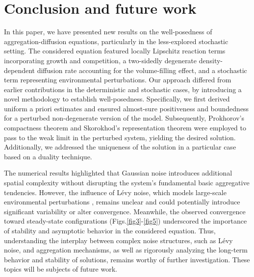 \documentclass[10pt,number,preprint,times]{elsarticle}
\numberwithin{equation}{section} %
\begin{document}
\section{Conclusion and future work}
\label{section9}
In this paper, we have presented new results on the well-posedness of aggregation-diffusion equations, particularly in the less-explored stochastic setting. The considered equation featured locally Lipschitz reaction terms incorporating growth and competition, a two-sidedly degenerate density-dependent diffusion rate accounting for the volume-filling effect, and a stochastic term representing environmental perturbations. Our approach differed from earlier contributions in the deterministic \cite{bendahmane2023optimal} and stochastic \cite{tang2024strong} cases, by introducing a novel methodology to establish well-posedness. Specifically, we first derived uniform a priori estimates and ensured almost-sure positiveness and boundedness for a perturbed non-degenerate version of the model. Subsequently, Prokhorov's compactness theorem and Skorokhod's representation theorem were employed to pass to the weak limit in the perturbed system, yielding the desired solution. Additionally, we addressed the uniqueness of the solution in a particular case based on a duality technique.


The numerical results highlighted that Gaussian noise introduces additional spatial complexity without disrupting  the system's fundamental basic aggregative tendencies.  However, the influence of Lévy noise, which models large-scale environmental perturbations \cite{mehdaoui2024well}, remains unclear and could potentially introduce significant variability or alter convergence. Meanwhile, the observed convergence toward steady-state configurations (Figs.\;\ref{fig3}-\ref{fig5}) underscored the importance of stability and asymptotic behavior in the considered equation. Thus, understanding the interplay between complex noise structures, such as Lévy noise, and aggregation mechanisms, as well as rigorously analyzing the long-term behavior and stability of solutions, remains worthy of further investigation. These topics will be subjects of future work.
\end{document}
